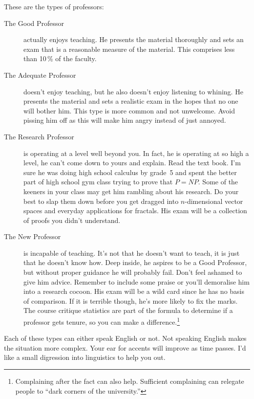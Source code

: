 \documentclass{book}
\begin{document}

These are the types of professors:

\begin{description}
\item[The Good Professor] actually enjoys teaching. He presents the material thoroughly and sets an exam that is a reasonable measure of the material. This comprises less than 10\,\% of the faculty.
\item[The Adequate Professor] doesn't enjoy teaching, but he also doesn't enjoy listening to whining. He presents the material and sets a realistic exam in the hopes that no one will bother him. This type is more common and not unwelcome. Avoid pissing him off as this will make him angry instead of just annoyed.
\item[The Research Professor] is operating at a level well beyond you. In fact, he is operating at so high a level, he can't come down to yours and explain. Read the text book. I'm sure he was doing high school calculus by grade~5 and spent the better part of high school gym class trying to prove that $P = NP$. Some of the keeners in your class may get him rambling about his research. Do your best to slap them down before you get dragged into $n$-dimensional vector spaces and everyday applications for fractals. His exam will be a collection of proofs you didn't understand.
\item[The New Professor] is incapable of teaching. It's not that he doesn't want to teach, it is just that he doesn't know how. Deep inside, he aspires to be a Good Professor, but without proper guidance he will probably fail. Don't feel ashamed to give him advice. Remember to include some praise or you'll demoralise him into a research cocoon. His exam will be a wild card since he has no basis of comparison. If it is terrible though, he's more likely to fix the marks. The course critique statistics are part of the formula to determine if a professor gets tenure, so you can make a difference.\footnote{Complaining after the fact can also help. Sufficient complaining can relegate people to ``dark corners of the university.''}
\end{description}

Each of these types can either speak English or not. Not speaking English makes the situation more complex. Your ear for accents will improve as time passes. I'd like a small digression into linguistics to help you out.
\end{document}
